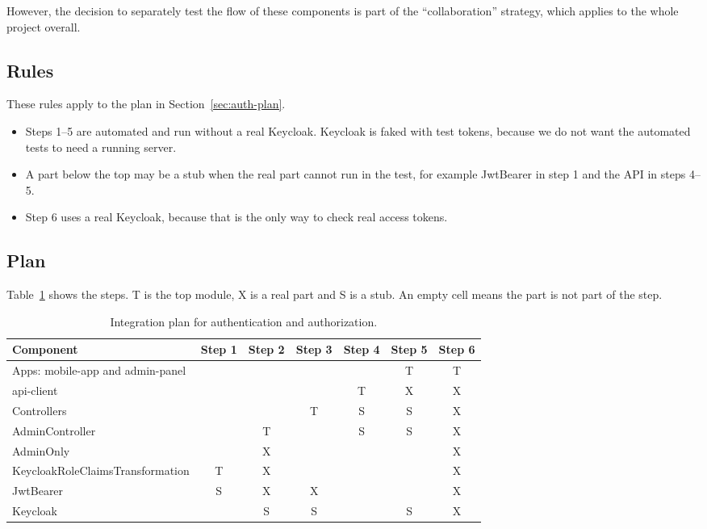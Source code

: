 \documentclass[a4paper,11pt]{article}
\begin{document}
However, the decision to separately test the flow of these components is part of the ``collaboration'' strategy, which applies to the whole project overall.
\subsection{Rules}
These rules apply to the plan in Section~\ref{sec:auth-plan}.
\begin{itemize}
  \item Steps 1--5 are automated and run without a real Keycloak. Keycloak is faked with test tokens, because we do not want the automated tests to need a running server.
  \item A part below the top may be a stub when the real part cannot run in the test, for example JwtBearer in step 1 and the API in steps 4--5.
  \item Step 6 uses a real Keycloak, because that is the only way to check real access tokens.
\end{itemize}

\subsection{Plan}
Table~\ref{tab:auth-integration-plan} shows the steps. T is the top module, X is a real part and S is a stub. An empty cell means the part is not part of the step.

\begin{table}[H]
\centering
\small
{}
\begin{tabular}{@{}l c c c c c c@{}}
\textbf{Component} & \textbf{Step 1} & \textbf{Step 2} & \textbf{Step 3} & \textbf{Step 4} & \textbf{Step 5} & \textbf{Step 6} \\
\hline
Apps: mobile-app and admin-panel &   &   &   &   & T & T \\
api-client                       &   &   &   & T & X & X \\
Controllers                      &   &   & T & S & S & X \\
AdminController                  &   & T &   & S & S & X \\
AdminOnly                        &   & X &   &   &   & X \\
KeycloakRoleClaimsTransformation & T & X &   &   &   & X \\
JwtBearer                        & S & X & X &   &   & X \\
Keycloak                         &   & S & S &   & S & X \\
\end{tabular}
\caption{Integration plan for authentication and authorization.}
\label{tab:auth-integration-plan}
\end{table}
\end{document}
